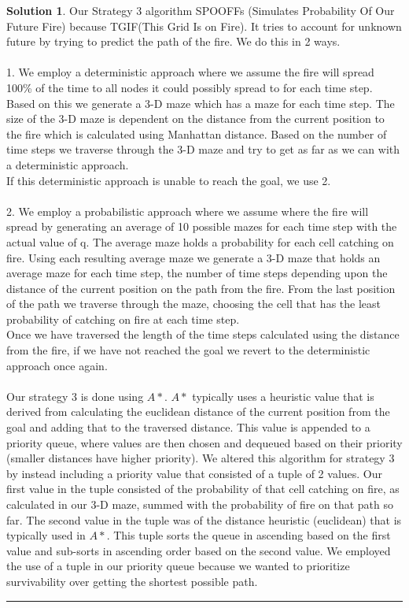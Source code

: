 \documentclass{article}
\theoremstyle{definition}
\def\fline{\rule{0.75\linewidth}{0.5pt}}
\newcommand{\finishline}{\vspace{-15pt}\begin{center}\fline\end{center}}
\newtheorem*{solution*}{Solution}
\newenvironment{solution}{\begin{solution*}}{{\finishline} \end{solution*}}
\begin{document}
\smallskip

\begin{solution}

	Our Strategy 3 algorithm SPOOFFs (Simulates Probability Of Our Future Fire) because TGIF(This Grid Is on Fire). It tries to account for unknown future by trying to predict the path of the fire. We do this in 2 ways. 
    \\\\
	1. We employ a deterministic approach where we assume the fire will spread 100\% of the time to all nodes it could possibly spread to for each time step. Based on this we generate a 3-D maze which has a maze for each time step. The size of the 3-D maze is dependent on the distance from the current position to the fire which is calculated using Manhattan distance. Based on the number of time steps we traverse through the 3-D maze and try to get as far as we can with a deterministic approach. 
	\\
	If this deterministic approach is unable to reach the goal, we use 2. 
	\\\\
	2. We employ a probabilistic approach where we assume where the fire will spread by generating an average of 10 possible mazes for each time step with the actual value of q. The average maze holds a probability for each cell catching on fire. Using each resulting average maze we generate a 3-D maze that holds an average maze for each time step, the number of time steps depending upon the distance of the current position on the path from the fire. From the last position of the path we traverse through the maze, choosing the cell that has the least probability of catching on fire at each time step.
	\\ 
	Once we have traversed the length of the time steps calculated using the distance from the fire, if we have not reached the goal we revert to the deterministic approach once again.
	\\\\
	Our strategy 3 is done using $A*$. $A*$ typically uses a heuristic value that is derived from calculating the euclidean distance of the current position from the goal and adding that to the traversed distance. This value is appended to a priority queue, where values are then chosen and dequeued based on their priority (smaller distances have higher priority). We altered this algorithm for strategy 3 by instead including a priority value that consisted of a tuple of 2 values. Our first value in the tuple consisted of the probability of that cell catching on fire, as calculated in our 3-D maze, summed with the probability of fire on that path so far. The second value in the tuple was of the distance heuristic (euclidean) that is typically used in $A*$. This tuple sorts the queue in ascending based on the first value and sub-sorts in ascending order based on the second value. We employed the use of a tuple in our priority queue because we wanted to prioritize survivability over getting the shortest possible path. 

\end{solution}
\end{document}
